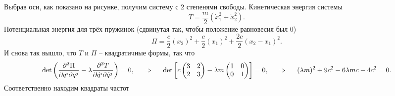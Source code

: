 Выбрав оси, как показано на рисунке, получим систему с 2 степенями свободы.  Кинетическая энергия системы
\begin{equation*}
    T = \frac{m}{2} \left(
        \dot{x}_1^2 + \dot{x}_2^2
    \right).
\end{equation*}
Потенциальная энергия для трёх пружинок (сдвинутая так, чтобы положение равновесия был $0$)
\begin{equation*}
    \Pi = \frac{c}{2} (x_2)^2 + \frac{c}{2} (x_1)^2 + \frac{2c}{2}
    \left(
       x_2 - x_1
    \right)^2.
\end{equation*}
И снова так вышло, что $T$ и $\Pi$ -- квадратичные формы, так что 
\begin{equation*}
     \det \left(
     \frac{\partial^2 \Pi}{\partial q^i \partial q^j} - \lambda \frac{\partial^2 T}{\partial \dot{q}^i \partial \dot{q}^j}\right) = 0,
     \hspace{0.5cm} \Rightarrow \hspace{0.5cm}
     \det\left[
        c\begin{pmatrix}
            3 & 2 \\
            2 & 3 \\
        \end{pmatrix} - 
        \lambda m\begin{pmatrix}
            1 & 0 \\
            0 & 1 \\
        \end{pmatrix}
     \right] = 0,
     \hspace{0.5cm} \Rightarrow \hspace{0.5cm}
     (\lambda m)^2 + 9 c^2 - 6 \lambda m c - 4 c^2 = 0.
\end{equation*}
Соответственно находим квадраты частот
